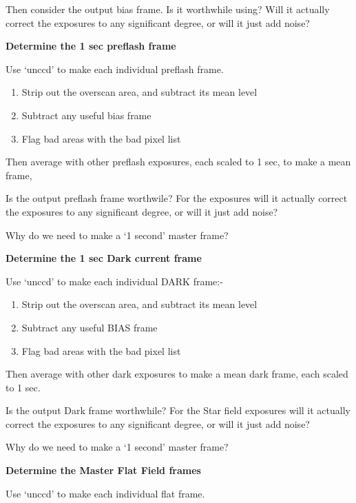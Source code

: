 \begin{small}
{{ Then consider the output bias frame. Is it worthwhile using? Will
 it actually correct the exposures to any significant degree, or
 will it just add noise?
 
 
 
{\hspace*{4ex} \bf   Determine the 1 sec preflash frame}
 
 Use `unccd' to make each individual preflash frame.
 
\begin{enumerate}
\item Strip out the overscan area, and subtract its mean level
\item Subtract any useful bias frame
\item Flag bad areas with the bad pixel list
\end{enumerate}
 
 Then average with other preflash exposures, each  scaled to 1 sec,
 to make a mean frame,
 
 Is the output preflash frame worthwile? For the exposures will
 it actually correct the exposures to any significant degree, or
 will it just add noise?
 
 Why do we need to make a `1 second' master frame?
 
{\hspace*{4ex} \bf  Determine the 1 sec Dark current frame}
 
 Use `unccd' to make each individual DARK frame:-
 
\begin{enumerate}
\item Strip out the overscan area, and subtract its mean level
\item Subtract any useful BIAS frame
\item Flag bad areas with the bad pixel list
\end{enumerate}
 
 Then average with other dark exposures to make a mean dark frame,
 each scaled to 1 sec.
 
 Is the output Dark frame worthwhile? For the Star field exposures will
 it actually correct the exposures to any significant degree, or
 will it just add noise?
 
 Why do we need to make a `1 second' master frame?
 
 
{\hspace*{4ex} \bf  Determine the Master Flat Field frames}
 
 Use `unccd' to make each individual flat frame.
 
}}
\end{small}
